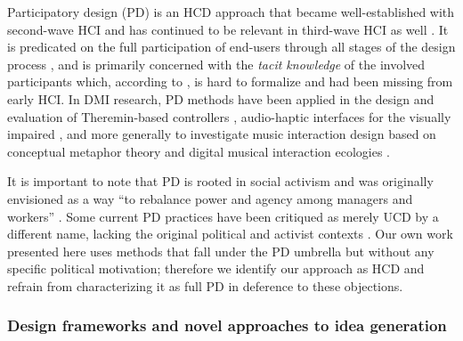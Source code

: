 \documentclass[letterpaper, 12pt]{article}
\begin{document}
Participatory design (PD) is an HCD approach that became well-established with second-wave HCI \citep{Bodker2015} and has continued to be relevant in third-wave HCI as well \citep{Muller2012}. It is predicated on the full participation of end-users through all stages of the design process \citep{Steen2011}, and is primarily concerned with the \emph{tacit knowledge} of the involved participants which, according to \citet{Spinuzzi2005}, is hard to formalize and had been missing from early HCI. In DMI research, PD methods have been applied in the design and evaluation of Theremin-based controllers \citep{Geiger2008}, audio-haptic interfaces for the visually impaired \citep{Metatla2016}, and more generally to investigate music interaction design based on conceptual metaphor theory \citep{wilkie2013towards} and digital musical interaction ecologies \citep{Fyans:2012}.

It is important to note that PD is rooted in social activism and was originally envisioned as a way ``to rebalance power and agency among managers and workers'' \citep[p. 1]{Bannon2018}. Some current PD practices have been critiqued as merely UCD by a different name, lacking the original political and activist contexts \citep{Bannon2018}. Our own work presented here uses methods that fall under the PD umbrella but without any specific political motivation; therefore we identify our approach as HCD and refrain from characterizing it as full PD in deference to these objections.




\subsubsection{Design frameworks and novel approaches to idea generation}
\label{sec:design-frameworks}
\end{document}

